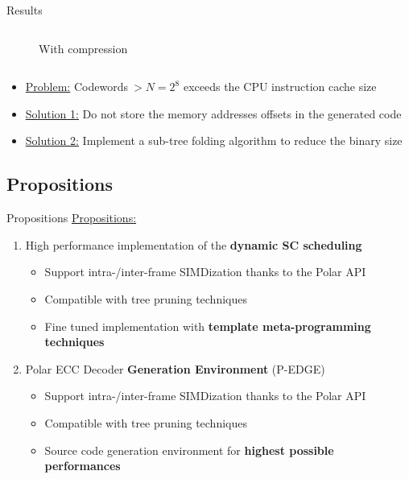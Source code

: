\begin{frame}{Results}
\begin{columns}
\begin{column}[T]{6.0cm}
\begin{figure}[!h]
{
    }
    \caption*{With compression}
    \end{figure}
  \end{column}
  \end{columns}
  \vfill
  \begin{itemize}
    \item \underline{Problem:} Codewords$~> N = 2^8$ exceeds the CPU instruction cache size
    \vspace{0.2cm}
    \item \underline{Solution 1:} Do not store the memory addresses offsets in the generated code
    \vspace{0.2cm}
    \item \underline{Solution 2:} Implement a sub-tree folding algorithm to reduce the binary size
  \end{itemize}
\end{frame}

\subsection[Propositions]{Propositions}

\begin{frame}{Propositions}
  \vfill
  \underline{Propositions:}

  \vspace{0.3cm}
  \begin{enumerate}
    \item High performance implementation of the \textbf{dynamic SC scheduling}
    \begin{itemize}
      \item Support intra-/inter-frame SIMDization thanks to the Polar API
      \item Compatible with tree pruning techniques
      \item Fine tuned implementation with \textbf{template meta-programming techniques}
    \end{itemize}
    \pause
    \vspace{0.3cm}
    \item Polar ECC Decoder \textbf{Generation Environment} (P-EDGE)
    \begin{itemize}
      \item Support intra-/inter-frame SIMDization thanks to the Polar API
      \item Compatible with tree pruning techniques
      \item Source code generation environment for \textbf{highest possible performances}
    \end{itemize}
  \end{enumerate}
  \vfill
\end{frame}

